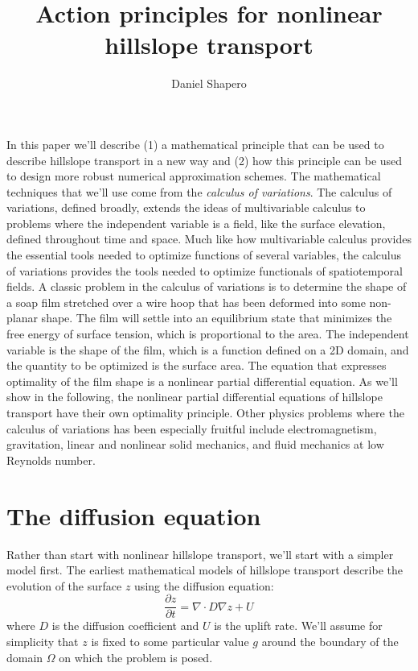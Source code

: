 \documentclass{article}
\title{Action principles for nonlinear hillslope transport}
\author{Daniel Shapero}
\date{}
\theoremstyle{definition}
\theoremstyle{plain}
\begin{document}
\maketitle

In this paper we'll describe (1) a mathematical principle that can be used to describe hillslope transport in a new way and (2) how this principle can be used to design more robust numerical approximation schemes.
The mathematical techniques that we'll use come from the \emph{calculus of variations}.
The calculus of variations, defined broadly, extends the ideas of multivariable calculus to problems where the independent variable is a field, like the surface elevation, defined throughout time and space.
Much like how multivariable calculus provides the essential tools needed to optimize functions of several variables, the calculus of variations provides the tools needed to optimize functionals of spatiotemporal fields.
A classic problem in the calculus of variations is to determine the shape of a soap film stretched over a wire hoop that has been deformed into some non-planar shape.
The film will settle into an equilibrium state that minimizes the free energy of surface tension, which is proportional to the area.
The independent variable is the shape of the film, which is a function defined on a 2D domain, and the quantity to be optimized is the surface area.
The equation that expresses optimality of the film shape is a nonlinear partial differential equation.
As we'll show in the following, the nonlinear partial differential equations of hillslope transport have their own optimality principle.
Other physics problems where the calculus of variations has been especially fruitful include electromagnetism, gravitation, linear and nonlinear solid mechanics, and fluid mechanics at low Reynolds number.

\section{The diffusion equation}

Rather than start with nonlinear hillslope transport, we'll start with a simpler model first.
The earliest mathematical models of hillslope transport describe the evolution of the surface $z$ using the diffusion equation:
\begin{equation}
    \frac{\partial z}{\partial t} = \nabla\cdot D\nabla z + U
\end{equation}
where $D$ is the diffusion coefficient and $U$ is the uplift rate.
We'll assume for simplicity that $z$ is fixed to some particular value $g$ around the boundary of the domain $\Omega$ on which the problem is posed.
\end{document}
